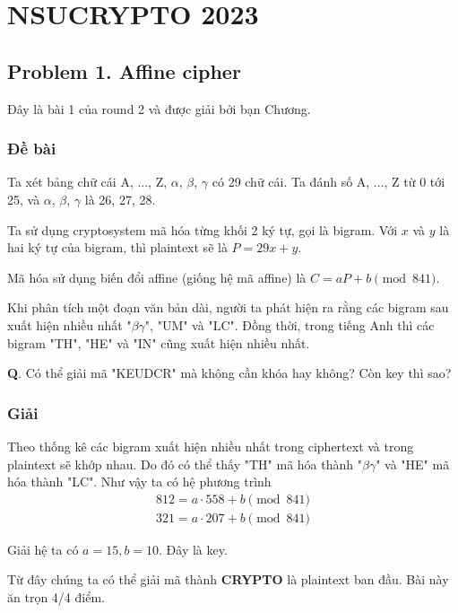 \chapter{NSUCRYPTO 2023}

\section*{Problem 1. Affine cipher}

Đây là bài 1 của round 2 và được giải bởi bạn Chương.

\subsection*{Đề bài}

Ta xét bảng chữ cái {A, ..., Z, $\alpha$, $\beta$, $\gamma$} có 29 chữ cái. Ta đánh số A, ..., Z từ 0 tới 25, và $\alpha$, $\beta$, $\gamma$ là 26, 27, 28.

Ta sử dụng cryptosystem mã hóa từng khối 2 ký tự, gọi là bigram. Với $x$ và $y$ là hai ký tự của bigram, thì plaintext sẽ là $P = 29 x + y$.

Mã hóa sử dụng biến đổi affine (giống hệ mã affine) là $C = a P + b \pmod{841}$.

Khi phân tích một đoạn văn bản dài, người ta phát hiện ra rằng các bigram sau xuất hiện nhiều nhất "$\beta\gamma$", "UM" và "LC". Đồng thời, trong tiếng Anh thì các bigram "TH", "HE" và "IN" cũng xuất hiện nhiều nhất.

\textbf{Q}. Có thể giải mã "KEUDCR" mà không cần khóa hay không? Còn key thì sao?

\subsection*{Giải}

Theo thống kê các bigram xuất hiện nhiều nhất trong ciphertext và trong plaintext sẽ khớp nhau. Do đó có thể thấy "TH" mã hóa thành "$\beta\gamma$" và "HE" mã hóa thành "LC". Như vậy ta có hệ phương trình
\begin{align*} 
    812 = a \cdot 558 + b \pmod{841} \\ 
    321 = a \cdot 207 + b \pmod{841}
\end{align*} 

Giải hệ ta có $a = 15, b = 10$. Đây là key.

Từ đây chúng ta có thể giải mã thành \textbf{CRYPTO} là plaintext ban đầu. Bài này ăn trọn 4/4 điểm.

